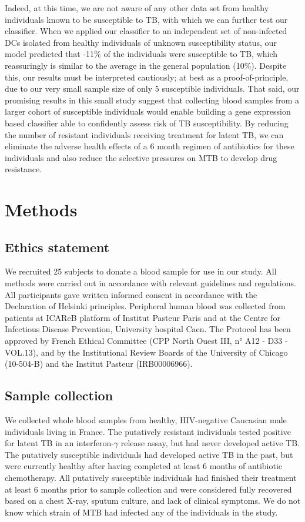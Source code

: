 \documentclass[fleqn,10pt]{wlscirep}
\begin{document}
Indeed, at this time, we are not aware of any other data set from
healthy individuals known to be susceptible to TB, with which we can
further test our classifier. When we applied our classifier to an
independent set of non-infected DCs isolated from healthy individuals
of unknown susceptibility status, our model predicted that
-11\% of the individuals were susceptible to TB, which
reassuringly is similar to the average in the general population
(10\%). Despite this, our results must be interpreted cautiously; at
best as a proof-of-principle, due to our very small sample size of
only 5 susceptible individuals. That said, our promising results in
this small study suggest that collecting blood samples from a larger
cohort of susceptible individuals would enable building a gene
expression based classifier able to confidently assess risk of TB
susceptibility. By reducing the number of resistant individuals
receiving treatment for latent TB, we can eliminate the adverse health
effects of a 6 month regimen of antibiotics for these individuals and
also reduce the selective pressures on MTB to develop drug resistance.
\section*{Methods}

\subsection*{Ethics statement}

We recruited 25 subjects to donate a blood sample for use in our
study. All methods were carried out in accordance with relevant
guidelines and regulations. All participants gave written informed
consent in accordance with the Declaration of Helsinki principles.
Peripheral human blood was collected from patients at ICAReB platform
of Institut Pasteur Paris and at the Centre for Infectious Disease
Prevention, University hospital Caen. The Protocol has been approved
by French Ethical Committee (CPP North Ouest III, n° A12 - D33
-VOL.13), and by the Institutional Review Boards of the University of
Chicago (10-504-B) and the Institut Pasteur (IRB00006966).
\subsection*{Sample collection}

We collected whole blood samples from healthy, HIV-negative Caucasian
male individuals living in France. The putatively resistant
individuals tested positive for latent TB in an interferon-$\gamma$
release assay, but had never developed active TB. The putatively
susceptible individuals had developed active TB in the past, but were
currently healthy after having completed at least 6 months of
antibiotic chemotherapy. All putatively susceptible individuals had
finished their treatment at least 6 months prior to sample collection
and were considered fully recovered based on a chest X-ray, sputum
culture, and lack of clinical symptoms. We do not know which strain of
MTB had infected any of the individuals in the study.
\end{document}
